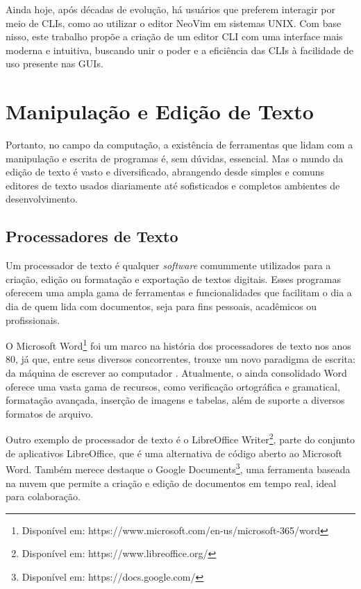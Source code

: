 Ainda hoje, após décadas de evolução, há usuários que preferem interagir por meio
de CLIs, como ao utilizar o editor NeoVim em sistemas UNIX. Com base nisso, este
trabalho propõe a criação de um editor CLI com uma interface mais moderna e
intuitiva, buscando unir o poder e a eficiência das CLIs à facilidade de uso presente
nas GUIs.

\section{Manipulação e Edição de Texto}

Portanto, no campo da computação, a existência de ferramentas que lidam com a
manipulação e escrita de programas é, sem dúvidas, essencial. Mas o mundo da edição
de texto é vasto e diversificado, abrangendo desde simples e comuns editores de
texto usados diariamente até sofisticados e completos ambientes de
desenvolvimento.

\subsection{Processadores de Texto}

Um processador de texto é qualquer \textit{software} comummente utilizados para
a criação, edição ou formatação e exportação de textos digitais. Esses programas
oferecem uma ampla gama de ferramentas e funcionalidades que facilitam o dia a
dia de quem lida com documentos, seja para fins pessoais, acadêmicos ou
profissionais.

O Microsoft Word\footnote{Disponível em: https://www.microsoft.com/en-us/microsoft-365/word}
foi um marco na história dos processadores de texto nos anos 80, já que, entre seus
diversos concorrentes, trouxe um novo paradigma de escrita: da máquina de escrever
ao computador \cite{inbook}. Atualmente, o ainda consolidado Word oferece uma vasta
gama de recursos, como verificação ortográfica e gramatical, formatação avançada,
inserção de imagens e tabelas, além de suporte a diversos formatos de arquivo.

Outro exemplo de processador de texto é o LibreOffice Writer\footnote{Disponível
em: https://www.libreoffice.org/}, parte do conjunto de aplicativos LibreOffice,
que é uma alternativa de código aberto ao Microsoft Word. Também merece destaque
o Google Documents\footnote{Disponível em: https://docs.google.com/}, uma ferramenta
baseada na nuvem que permite a criação e edição de documentos em tempo real,
ideal para colaboração.

